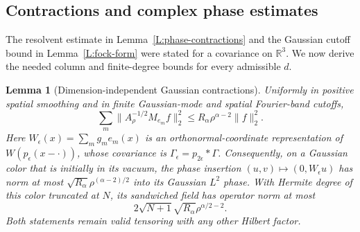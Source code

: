 \documentclass[12pt,oneside,openany]{book}
\makeatletter
\let\lean@pending\@empty
\newcommand{\LeanMarker}[1]{\gdef\lean@pending{#1}}
\numberwithin{equation}{section}
\newtheorem{lemma}[theorem]{Lemma}
\theoremstyle{nogostyle}
\theoremstyle{definition}
\newcommand{\R}{\mathbb{R}}
\makeatother
\begin{document}
\subsection{Contractions and complex phase estimates}

The resolvent estimate in Lemma~\ref{L:phase-contractions} and the Gaussian
cutoff bound in Lemma~\ref{L:fock-form} were stated for a covariance on
$\R^3$. We now derive the needed column and finite-degree bounds for every
admissible $d$.

\LeanMarker{L:interval-contractions}
\begin{lemma}[Dimension-independent Gaussian contractions]
  \label{L:interval-contractions}
  Uniformly in positive spatial smoothing and in finite Gaussian-mode and
  spatial Fourier-band cutoffs,
  \begin{equation}\label{E:interval-column}
    \sum_m\|A_\rho^{-1/2}M_{e_m}f\|_2^2
    \le R_\alpha\rho^{\alpha-2}\|f\|_2^2.
  \end{equation}
  Here $W_\epsilon(x) = \sum_m g_me_m(x)$ is an orthonormal-coordinate
  representation of $W(p_\epsilon(x-\cdot))$, whose covariance is
  $\Gamma_\epsilon = p_{2\epsilon}*\Gamma$. Consequently, on a Gaussian color
  that is initially in its vacuum, the phase insertion
  $(u,v)\mapsto(0,W_\epsilon u)$ has norm at most
  $\sqrt{R_\alpha}\rho^{(\alpha-2)/2}$ into its Gaussian $L^2$ phase. With
  Hermite degree of this color truncated at $N$, its sandwiched field has
  operator norm at most
  \begin{equation}\label{E:interval-fock}
    2\sqrt{N+1}\sqrt{R_\alpha}\rho^{\alpha/2-2}.
  \end{equation}
  Both statements remain valid tensoring with any other Hilbert factor.
\end{lemma}
\end{document}
